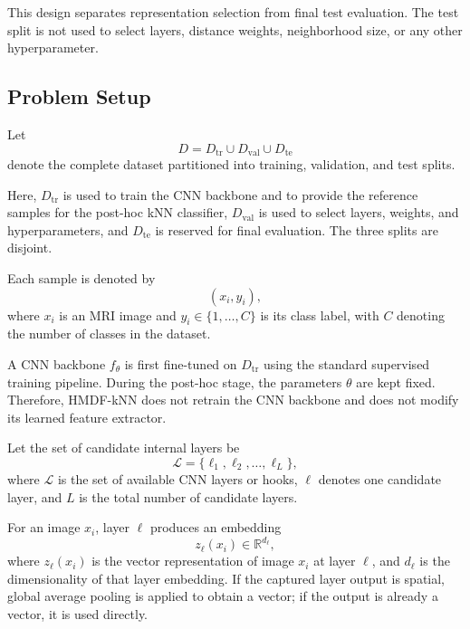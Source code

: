 \documentclass[main.tex]{subfiles}
\begin{document}
This design separates representation selection from final test evaluation. The test split is not used to select layers, distance weights, neighborhood size, or any other hyperparameter.

\subsection{Problem Setup}

Let
\begin{equation}
  D = D_{\mathrm{tr}} \cup D_{\mathrm{val}} \cup D_{\mathrm{te}}
\end{equation}
denote the complete dataset partitioned into training, validation, and test splits.

Here, \(D_{\mathrm{tr}}\) is used to train the CNN backbone and to provide the reference samples for the post-hoc kNN classifier, \(D_{\mathrm{val}}\) is used to select layers, weights, and hyperparameters, and \(D_{\mathrm{te}}\) is reserved for final evaluation. The three splits are disjoint.

Each sample is denoted by
\begin{equation}
  (x_i,y_i),
\end{equation}
where \(x_i\) is an MRI image and \(y_i \in \{1,\ldots,C\}\) is its class label, with \(C\) denoting the number of classes in the dataset.

A CNN backbone \(f_{\theta}\) is first fine-tuned on \(D_{\mathrm{tr}}\) using the standard supervised training pipeline. During the post-hoc stage, the parameters \(\theta\) are kept fixed. Therefore, HMDF-kNN does not retrain the CNN backbone and does not modify its learned feature extractor.

Let the set of candidate internal layers be
\begin{equation}
  \mathcal{L} = \{\ell_1,\ell_2,\ldots,\ell_L\},
\end{equation}
where \(\mathcal{L}\) is the set of available CNN layers or hooks, \(\ell\) denotes one candidate layer, and \(L\) is the total number of candidate layers.

For an image \(x_i\), layer \(\ell\) produces an embedding
\begin{equation}
  z_{\ell}(x_i) \in \mathbb{R}^{d_{\ell}},
\end{equation}
where \(z_{\ell}(x_i)\) is the vector representation of image \(x_i\) at layer \(\ell\), and \(d_{\ell}\) is the dimensionality of that layer embedding. If the captured layer output is spatial, global average pooling is applied to obtain a vector; if the output is already a vector, it is used directly.
\end{document}
